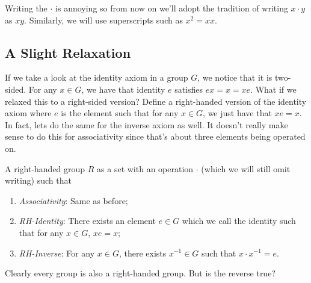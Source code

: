 \documentclass{article}
\begin{document}
Writing the $\cdot$ is annoying so from now on we'll adopt the tradition of writing $x \cdot y$ as $xy$.
Similarly, we will use superscripts such as $x^{2} = xx$.

\subsection*{A Slight Relaxation}

If we take a look at the identity axiom in a group $G$, we notice that it is two-sided.
For any $x \in G$, we have that identity $e$ satisfies $ex = x = xe$.
What if we relaxed this to a right-sided version?
Define a right-handed version of the identity axiom where $e$ is the element such that for any $x \in G$, we just have that $xe = x$.
In fact, lets do the same for the inverse axiom as well.
It doesn't really make sense to do this for associativity since that's about three elements being operated on.

\begin{defn}
  A right-handed group $R$ as a set with an operation $\cdot$ (which we will still omit writing) such that
  \begin{enumerate}
  \item \emph{Associativity}: Same as before;
  \item \emph{RH-Identity}: There exists an element $e \in G$ which we call the identity such that for any $x \in G$, $xe = x$;
  \item \emph{RH-Inverse}: For any $x \in G$, there exists $x^{-1} \in G$ such that $x \cdot x^{-1} = e$.
  \end{enumerate}
\end{defn}
Clearly every group is also a right-handed group.
But is the reverse true?
\end{document}
